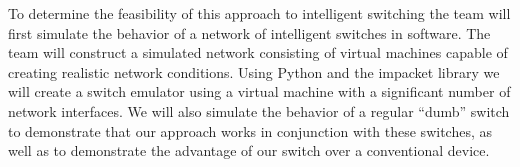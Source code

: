 \documentclass{article}
\begin{document}
	To determine the feasibility of this approach to intelligent switching the team will first simulate the behavior of a network of intelligent switches in software.
	The team will construct a simulated network consisting of virtual machines capable of creating realistic network conditions.
	Using Python and the impacket library we will create a switch emulator using a virtual machine with a significant number of network interfaces.
	We will also simulate the behavior of a regular ``dumb'' switch to demonstrate that our approach works in conjunction with these switches, as well as to demonstrate the advantage of our switch over a conventional device.
\end{document}
